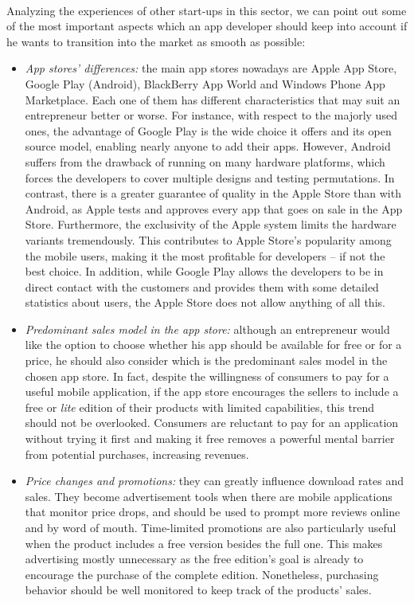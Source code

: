 \documentclass[twoside]{report}
\begin{document}
	\paragraph{}
	Analyzing the experiences of other start-ups in this sector, we can point out some of the most important aspects which an app developer should keep into account if he wants to transition into the market as smooth as possible:
	\begin{itemize}
		\item \emph{App stores' differences:} the main app stores nowadays are Apple App Store, Google Play (Android), BlackBerry App World and Windows Phone App Marketplace. Each one of them has different characteristics that may suit an entrepreneur better or worse. For instance, with respect to the majorly used ones, the advantage of Google Play is the wide choice it offers and its open source model, enabling nearly anyone to add their apps. However, Android suffers from the drawback of running on many hardware platforms, which forces the developers to cover multiple designs and testing permutations. In contrast, there is a greater guarantee of quality in the Apple Store than with Android, as Apple tests and approves every app that goes on sale in the App Store. Furthermore, the exclusivity of the Apple system limits the hardware variants tremendously. This contributes to Apple Store's popularity among the mobile users, making it the most profitable for developers – if not the best choice. In addition, while Google Play allows the developers to be in direct contact with the customers and provides them with some detailed statistics about users, the Apple Store does not allow anything of all this.
		\item \emph{Predominant sales model in the app store:} although an entrepreneur would like the option to choose whether his app should be available for free or for a price, he should also consider which is the predominant sales model in the chosen app store. In fact, despite the willingness of consumers to pay for a useful mobile application, if the app store encourages the sellers to include a free or \emph{lite} edition of their products with limited capabilities, this trend should not be overlooked. Consumers are reluctant to pay for an application without trying it first and making it free removes a powerful mental barrier from potential purchases, increasing revenues.
		\item \emph{Price changes and promotions:} they can greatly influence download rates and sales. They become advertisement tools when there are mobile applications that monitor price drops, and should be used to prompt more reviews online and by word of mouth. Time-limited promotions are also particularly useful when the product includes a free version besides the full one. This makes advertising mostly unnecessary as the free edition's goal is already to encourage the purchase of the complete edition. Nonetheless, purchasing behavior should be well monitored to keep track of the products' sales.

\end{itemize}
\end{document}
